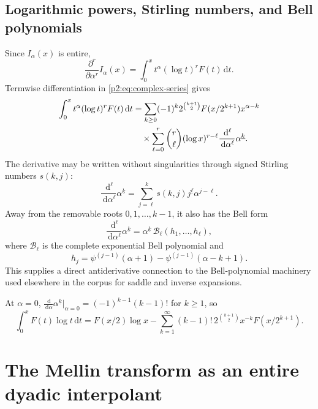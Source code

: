 \documentclass[11pt,oneside]{article}
\theoremstyle{definition}
\theoremstyle{remark}
\newcommand{\dd}{\,\mathrm d}
\newcommand{\fall}[2]{#1^{\underline{#2}}}
\newcommand{\1}{\mathbf 1}
\begin{document}
\subsection{Logarithmic powers, Stirling numbers, and Bell polynomials}
Since $I_\alpha(x)$ is entire,
\begin{equation}
 \frac{\partial^r}{\partial\alpha^r}I_\alpha(x)
 =\int_0^xt^\alpha(\log t)^rF(t)\dd t.                    \label{p2:eq:log-derivative}
\end{equation}
Termwise differentiation in \eqref{p2:eq:complex-series} gives
\begin{align}
 \int_0^xt^\alpha(\log t)^rF(t)\dd t
 &=\sum_{k\ge0}(-1)^k2^{\binom{k+1}{2}}F(x/2^{k+1})x^{\alpha-k} \notag\\
 &\quad\times\sum_{\ell=0}^{r}\binom r\ell
 (\log x)^{r-\ell}\frac{\dd^\ell}{\dd\alpha^\ell}
 \fall{\alpha}{k}.                                       \label{p2:eq:log-series}
\end{align}
The derivative may be written without singularities through signed Stirling
numbers $s(k,j)$:
\begin{equation}
 \frac{\dd^\ell}{\dd\alpha^\ell}\fall{\alpha}{k}
 =\sum_{j=\ell}^{k}s(k,j)\fall{j}{\ell}\alpha^{j-\ell}.  \label{p2:eq:stirling-derivative}
\end{equation}
Away from the removable roots $0,1,\ldots,k-1$, it also has the Bell form
\begin{equation}
 \frac{\dd^\ell}{\dd\alpha^\ell}\fall{\alpha}{k}
 =\fall{\alpha}{k}\,
 \mathcal B_\ell(h_1,\ldots,h_\ell),                     \label{p2:eq:bell-derivative}
\end{equation}
where $\mathcal B_\ell$ is the complete exponential Bell polynomial and
\begin{equation}
 h_j=\psi^{(j-1)}(\alpha+1)-\psi^{(j-1)}(\alpha-k+1).      \label{p2:eq:bell-h}
\end{equation}
This supplies a direct antiderivative connection to the Bell-polynomial
machinery used elsewhere in the corpus for saddle and inverse expansions.

At $\alpha=0$, $\frac{\dd}{\dd\alpha}\fall{\alpha}{k}|_{\alpha=0}
=(-1)^{k-1}(k-1)!$ for $k\ge1$, so
\begin{equation}
 \boxed{
 \int_0^xF(t)\log t\dd t
 =F(x/2)\log x-
 \sum_{k=1}^{\infty}(k-1)!\,2^{\binom{k+1}{2}}
 x^{-k}F(x/2^{k+1}).}                                     \label{p2:eq:log-explicit}
\end{equation}

\section{The Mellin transform as an entire dyadic interpolant}
\label{p2:sec:mellin}
\end{document}
